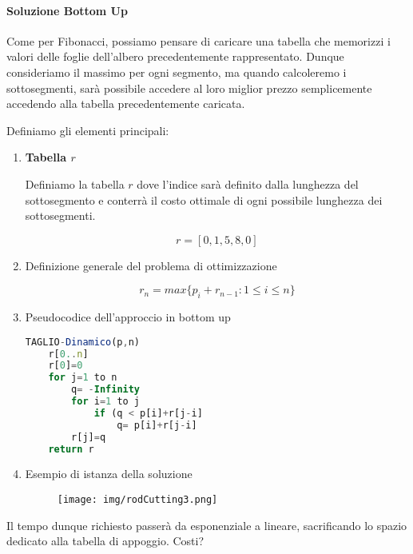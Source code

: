 \documentclass{article}
\begin{document}
\paragraph{Soluzione Bottom Up} Come per Fibonacci, possiamo pensare di caricare una tabella che memorizzi i valori delle foglie dell'albero precedentemente rappresentato. Dunque consideriamo il massimo per ogni segmento, ma quando calcoleremo i sottosegmenti, sarà possibile accedere al loro miglior prezzo semplicemente accedendo alla tabella precedentemente caricata.

Definiamo gli elementi principali:

\begin{enumerate}

\item \textbf{Tabella $r$}

Definiamo la tabella $r$ dove l'indice sarà definito dalla lunghezza del sottosegmento e conterrà il costo ottimale di ogni possibile lunghezza dei sottosegmenti.

\begin{equation}
    r=[0,1,5,8,0]
\end{equation}

\item Definizione generale del problema di ottimizzazione

\begin{equation}
    r_{n} = max \{ p_{i} + r_{n-1} : 1 \leq i \leq n \}
\end{equation}

\item Pseudocodice dell'approccio in bottom up

\begin{lstlisting}[language=JavaScript]
TAGLIO-Dinamico(p,n)
    r[0..n]
    r[0]=0
    for j=1 to n
        q= -Infinity
        for i=1 to j
            if (q < p[i]+r[j-i]
                q= p[i]+r[j-i]
        r[j]=q
    return r
\end{lstlisting}

\item Esempio di istanza della soluzione

\begin{figure}[htbp]
        \center
        \texttt{[image: img/rodCutting3.png]}
    \end{figure}

\end{enumerate}

Il tempo dunque richiesto passerà da esponenziale a lineare, sacrificando lo spazio dedicato alla tabella di appoggio. Costi?
\end{document}

